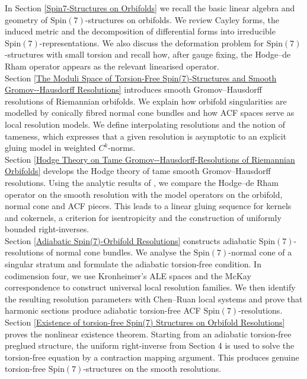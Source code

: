 \documentclass[psamsfonts]{amsart}
\theoremstyle{plain}
\theoremstyle{definition}{
\newtheorem{defi}{Definition}[section]
\newtheorem{ass}{Assumption}
\newtheorem*{nota}{Notation}}
\theoremstyle{remark}{
\newtheorem{rem}{Remark}
\newtheorem{ex}{Example}}
\theoremstyle{plain}{
\newtheorem{thm}{Theorem}[section]
\newtheorem{lem}{Lemma}[section]
\newtheorem{cor}{Corollary}[section]
\newtheorem{prop}{Proposition}[section]
\newtheorem{con}{Conjecture}[section]}
\newcommand{\m}[1]{{\mathrm{#1}}}
\begin{document}
In Section \ref{Spin7-Structures on Orbifolds} we recall the basic linear algebra and geometry of $\m{Spin}(7)$-structures on orbifolds. We review Cayley forms, the induced metric and the decomposition of differential forms into irreducible $\m{Spin}(7)$-representations. We also discuss the deformation problem for $\m{Spin}(7)$-structures with small torsion and recall how, after gauge fixing, the Hodge--de Rham operator appears as the relevant linearised operator.\\

Section \ref{The Moduli Space of Torsion-Free Spin(7)-Structures and Smooth Gromov--Hausdorff Resolutions} introduces smooth Gromov--Hausdorff resolutions of Riemannian orbifolds. We explain how orbifold singularities are modelled by conically fibred normal cone bundles and how ACF spaces serve as local resolution models. We define interpolating resolutions and the notion of tameness, which expresses that a given resolution is asymptotic to an explicit gluing model in weighted $C^k$-norms.\\

Section \ref{Hodge Theory on Tame Gromov--Hausdorff-Resolutions of Riemannian Orbifolds} develops the Hodge theory of tame smooth Gromov--Hausdorff resolutions. Using the analytic results of \cite{majewskiDirac}, we compare the Hodge--de Rham operator on the smooth resolution with the model operators on the orbifold, normal cone and ACF pieces. This leads to a linear gluing sequence for kernels and cokernels, a criterion for isentropicity and the construction of uniformly bounded right-inverses.\\

Section \ref{Adiabatic Spin(7)-Orbifold Resolutions} constructs adiabatic $\m{Spin}(7)$-resolutions of normal cone bundles. We analyse the $\m{Spin}(7)$-normal cone of a singular stratum and formulate the adiabatic torsion-free condition. In codimension four, we use Kronheimer's ALE spaces and the McKay correspondence to construct universal local resolution families. We then identify the resulting resolution parameters with Chen--Ruan local systems and prove that harmonic sections produce adiabatic torsion-free ACF $\m{Spin}(7)$-resolutions.\\

Section \ref{Existence of torsion-free Spin(7) Structures on Orbifold Resolutions} proves the nonlinear existence theorem. Starting from an adiabatic torsion-free preglued structure, the uniform right-inverse from Section 4 is used to solve the torsion-free equation by a contraction mapping argument. This produces genuine torsion-free $\m{Spin}(7)$-structures on the smooth resolutions.\\
\end{document}
